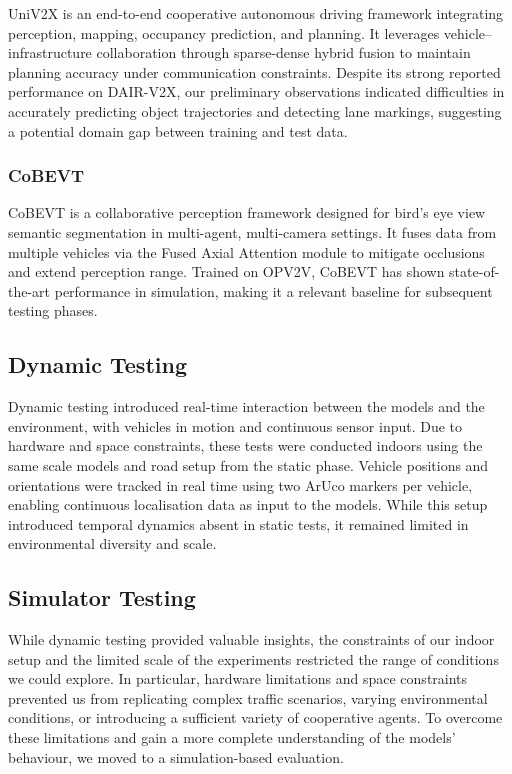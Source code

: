 UniV2X is an end-to-end cooperative autonomous driving framework integrating perception, mapping, occupancy prediction, and planning.
It leverages vehicle–infrastructure collaboration through sparse-dense hybrid fusion to maintain planning accuracy under communication constraints.
Despite its strong reported performance on DAIR-V2X, our preliminary observations indicated difficulties in accurately predicting object trajectories and detecting lane markings, suggesting a potential domain gap between training and test data.

\subsubsection{CoBEVT}

CoBEVT is a collaborative perception framework designed for bird’s eye view semantic segmentation in multi-agent, multi-camera settings.
It fuses data from multiple vehicles via the Fused Axial Attention module to mitigate occlusions and extend perception range.
Trained on OPV2V, CoBEVT has shown state-of-the-art performance in simulation, making it a relevant baseline for subsequent testing phases.

\subsection{Dynamic Testing}

Dynamic testing introduced real-time interaction between the models and the environment, with vehicles in motion and continuous sensor input.
Due to hardware and space constraints, these tests were conducted indoors using the same scale models and road setup from the static phase.
Vehicle positions and orientations were tracked in real time using two ArUco markers per vehicle, enabling continuous localisation data as input to the models.
While this setup introduced temporal dynamics absent in static tests, it remained limited in environmental diversity and scale.

\subsection{Simulator Testing}

While dynamic testing provided valuable insights, the constraints of our indoor setup and the limited scale of the experiments restricted the range of conditions we could explore.
In particular, hardware limitations and space constraints prevented us from replicating complex traffic scenarios, varying environmental conditions, or introducing a sufficient variety of cooperative agents.
To overcome these limitations and gain a more complete understanding of the models’ behaviour, we moved to a simulation-based evaluation.

